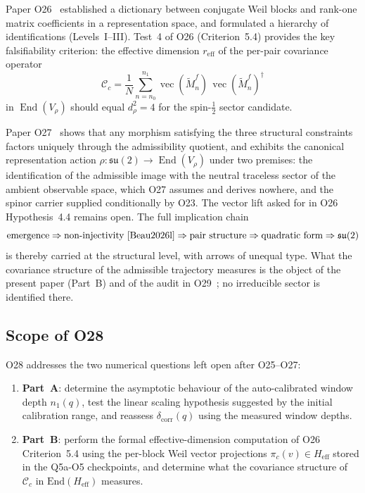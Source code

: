 \documentclass[11pt,a4paper]{article}
\theoremstyle{definition}
\begin{document}
    Paper O26~\cite{Beau2026a30} established a dictionary between conjugate Weil blocks and
    rank-one matrix coefficients in a representation space, and formulated a hierarchy of
    identifications (Levels~I--III).
    Test~4 of O26 (Criterion~5.4) provides the key falsifiability criterion: the effective
    dimension $r_{\mathrm{eff}}$ of the per-pair covariance operator
    \begin{equation}
      \mathcal{C}_c = \frac{1}{N}
      \sum_{n=n_0}^{n_1}
      \operatorname{vec}(\widetilde{M}^f_n)\,\operatorname{vec}(\widetilde{M}^f_n)^\dagger
      \label{eq:covariance}
    \end{equation}
    in $\operatorname{End}(V_\rho)$ should equal $d_\rho^2 = 4$ for the spin-$\tfrac{1}{2}$
    sector candidate.

    Paper O27~\cite{Beau2026a31} shows that any morphism satisfying the three structural
    constraints factors uniquely through the admissibility quotient, and exhibits the canonical
    representation action $\rho \colon \mathfrak{su}(2) \to \operatorname{End}(V_\rho)$ under two
    premises: the identification of the admissible image with the neutral traceless sector of the
    ambient observable space, which O27 assumes and derives nowhere, and the spinor carrier
    supplied conditionally by O23.
    The vector lift asked for in O26 Hypothesis~4.4 remains open.
    The full implication chain
    \[
      \text{emergence} \Rightarrow \text{non-injectivity}~\cite{Beau2026l}
      \Rightarrow \text{pair structure} \Rightarrow \text{quadratic form}
      \Rightarrow \mathfrak{su}(2)
    \]
    is thereby carried at the structural level, with arrows of unequal type.
    What the covariance structure of the admissible trajectory measures is the object of the
    present paper (Part~B) and of the audit in O29~\cite{Beau2026a33}; no irreducible sector is
    identified there.

  \subsection{Scope of O28}

    O28 addresses the two numerical questions left open after O25--O27:
    \begin{enumerate}
      \item \textbf{Part~A}: determine the asymptotic behaviour of the auto-calibrated window depth
      $n_1(q)$, test the linear scaling hypothesis suggested by the initial calibration range, and
      reassess $\delta_{\mathrm{corr}}(q)$ using the measured window depths.
      \item \textbf{Part~B}: perform the formal effective-dimension computation of
      O26 Criterion~5.4 using the per-block Weil vector projections $\pi_c(v) \in H_{\mathrm{eff}}$
      stored in the Q5a-O5 checkpoints, and determine what the covariance structure of
      $\mathcal{C}_c$ in $\mathrm{End}(H_{\mathrm{eff}})$ measures.
    \end{enumerate}
\end{document}
